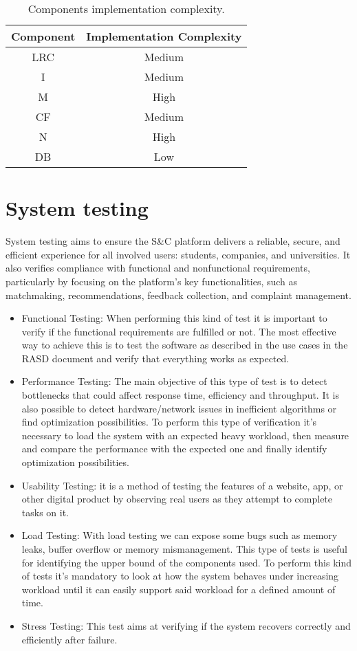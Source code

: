 \begin{table}[H]
    \centering
    \begin{tabular}{|c|c|} \hline 
         Component& Implementation Complexity\\ \hline 
         LRC& Medium\\ \hline 
         I& Medium\\ \hline 
         M& High\\ \hline 
         CF& Medium\\ \hline 
         N& High\\ \hline
         DB& Low\\ \hline
    \end{tabular}
\caption{Components implementation complexity.}
\end{table}

\section{System testing}
System testing aims to ensure the S\&C platform delivers a reliable, secure, and efficient experience for all involved users: students, companies, and universities. It also verifies compliance with functional and nonfunctional requirements, particularly by focusing on the platform's key functionalities, such as matchmaking, recommendations, feedback collection, and complaint management. 

\begin{itemize}
    \item Functional Testing: When performing this kind of test it is important to verify if the
functional requirements are fulfilled or not. The most effective way to achieve this is to test the software as described in the use cases in the RASD document and verify that everything works as expected.
    \item Performance Testing: The main objective of this type of test is to detect bottlenecks that could affect response time, efficiency and throughput. It is also possible to detect hardware/network issues in inefficient algorithms or find optimization possibilities. To perform this type of verification it’s necessary to load the
system with an expected heavy workload, then measure and compare the performance with the expected one and finally identify optimization possibilities.
\item Usability Testing: it is a method of testing the features of a website, app, or other digital product by observing real users as they attempt to complete tasks on it.
\item Load Testing: With load testing we can expose some bugs such as memory leaks, buffer overflow or memory mismanagement. This type of tests is useful for identifying the upper bound of the components used. To perform this kind of tests it’s mandatory to look at how the system behaves under increasing workload until it can easily support said workload for a defined amount of time.
\item Stress Testing: This test aims at verifying if the system recovers correctly and efficiently after failure. 
\end{itemize}

